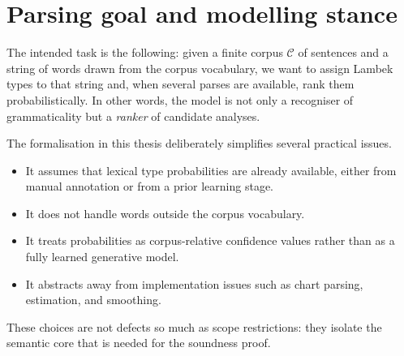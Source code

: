 \section{Parsing goal and modelling stance}
The intended task is the following: given a finite corpus $\mathcal C$ of sentences and a string of
words drawn from the corpus vocabulary, we want to assign Lambek types to that string and,
when several parses are available, rank them probabilistically. In other words, the model is not
only a recogniser of grammaticality but a \emph{ranker} of candidate analyses.

The formalisation in this thesis deliberately simplifies several practical issues.
\begin{itemize}
    \item It assumes that lexical type probabilities are already available, either from manual
    annotation or from a prior learning stage.
    \item It does not handle words outside the corpus vocabulary.
    \item It treats probabilities as corpus-relative confidence values rather than as a fully learned
    generative model.
    \item It abstracts away from implementation issues such as chart parsing, estimation, and
    smoothing.
\end{itemize}
These choices are not defects so much as scope restrictions: they isolate the semantic core that
is needed for the soundness proof.

